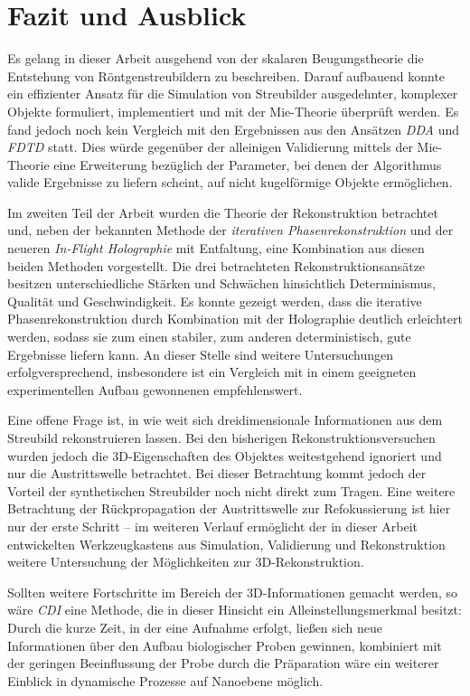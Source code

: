 \chapter{Fazit und Ausblick}
Es gelang in dieser Arbeit ausgehend von der skalaren Beugungstheorie die Entstehung von Röntgenstreubildern zu beschreiben. Darauf aufbauend konnte ein effizienter Ansatz für die Simulation von Streubilder ausgedehnter, komplexer Objekte formuliert, implementiert und mit der Mie-Theorie überprüft werden. Es fand jedoch noch kein Vergleich mit den Ergebnissen aus den Ansätzen \textit{DDA} und \textit{FDTD} statt. Dies würde gegenüber der alleinigen Validierung mittels der Mie-Theorie eine Erweiterung bezüglich der Parameter, bei denen der Algorithmus valide Ergebnisse zu liefern scheint, auf nicht kugelförmige Objekte ermöglichen. 

Im zweiten Teil der Arbeit wurden die Theorie der Rekonstruktion betrachtet und, neben der bekannten Methode der \textit{iterativen Phasenrekonstruktion} und der neueren \textit{In-Flight Holographie} mit Entfaltung, eine Kombination aus diesen beiden Methoden vorgestellt. Die drei betrachteten Rekonstruktionsansätze besitzen unterschiedliche Stärken und Schwächen hinsichtlich Determinismus, Qualität und Geschwindigkeit. Es konnte gezeigt werden, dass die iterative Phasenrekonstruktion durch Kombination mit der Holographie deutlich erleichtert werden, sodass sie zum einen stabiler, zum anderen deterministisch, gute Ergebnisse liefern kann. An dieser Stelle sind weitere Untersuchungen erfolgversprechend, insbesondere ist ein Vergleich mit in einem geeigneten experimentellen Aufbau gewonnenen empfehlenswert.

Eine offene Frage ist, in wie weit sich dreidimensionale Informationen aus dem Streubild rekonstruieren lassen. Bei den bisherigen Rekonstruktionsversuchen wurden jedoch die 3D-Eigenschaften des Objektes weitestgehend ignoriert und nur die Austrittswelle betrachtet. Bei dieser Betrachtung kommt jedoch der Vorteil der synthetischen Streubilder noch nicht direkt zum Tragen. Eine weitere Betrachtung der Rückpropagation der Austrittswelle zur Refokussierung ist hier nur der erste Schritt -- im weiteren Verlauf ermöglicht der in dieser Arbeit entwickelten Werkzeugkastens aus Simulation, Validierung und Rekonstruktion weitere Untersuchung der Möglichkeiten zur 3D-Rekonstruktion. 

Sollten weitere Fortschritte im Bereich der 3D-Informationen gemacht werden, so wäre \textit{CDI} eine Methode, die in dieser Hinsicht ein Alleinstellungsmerkmal besitzt: Durch die kurze Zeit, in der eine Aufnahme erfolgt, ließen sich neue Informationen über den Aufbau biologischer Proben gewinnen, kombiniert mit der geringen Beeinflussung der Probe durch die Präparation wäre ein weiterer Einblick in dynamische Prozesse auf Nanoebene möglich. 